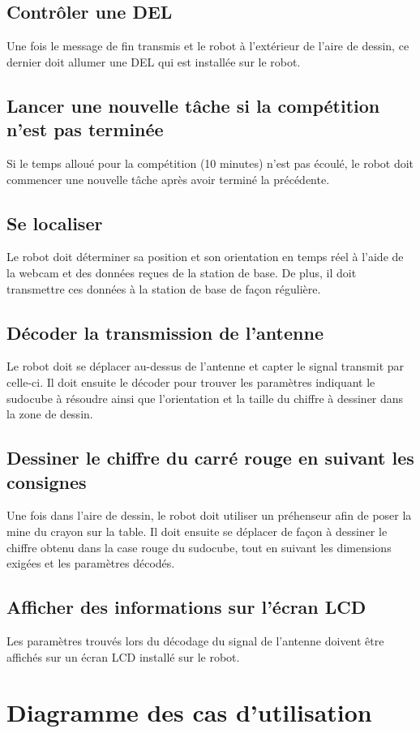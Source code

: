 \subsection{Contrôler une DEL}
Une fois le message de fin transmis et le robot à l'extérieur de l'aire de dessin, ce dernier doit allumer une DEL qui est installée sur le robot.
\subsection{Lancer une nouvelle tâche si la compétition n'est pas terminée}
Si le temps alloué pour la compétition (10 minutes) n'est pas écoulé, le robot doit commencer une nouvelle tâche après avoir terminé la précédente.
\subsection{Se localiser}
Le robot doit déterminer sa position et son orientation en temps réel à l'aide de la webcam et des données reçues de la station de base. De plus, il doit transmettre ces données à la station de base de façon régulière.
\subsection{Décoder la transmission de l'antenne}
Le robot doit se déplacer au-dessus de l'antenne et capter le signal transmit par celle-ci. Il doit ensuite le décoder pour trouver les paramètres indiquant le sudocube à résoudre ainsi que l'orientation et la taille du chiffre à dessiner dans la zone de dessin.
\subsection{Dessiner le chiffre du carré rouge en suivant les consignes}
Une fois dans l'aire de dessin, le robot doit utiliser un préhenseur afin de poser la mine du crayon sur la table. Il doit ensuite se déplacer de façon à dessiner le chiffre obtenu dans la case rouge du sudocube, tout en suivant les dimensions exigées et les paramètres décodés. 
\subsection{Afficher des informations sur l'écran LCD}
Les paramètres trouvés lors du décodage du signal de l'antenne doivent être affichés sur un écran LCD installé sur le robot.
\section{Diagramme des cas d'utilisation}
\label{use_cases}
\addtolength{\evensidemargin}{-1in}	
